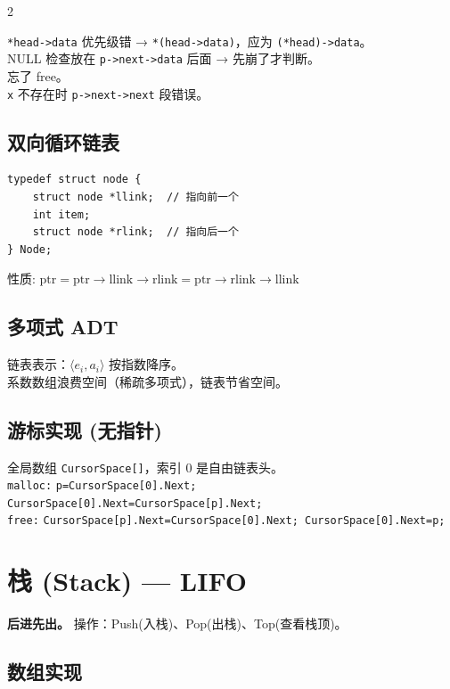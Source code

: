 \documentclass[10pt,a4paper]{article}
\begin{document}
\begin{multicols}{2}
\begin{bugbox}
\texttt{*head->data} 优先级错 → \texttt{*(head->data)}，应为 \texttt{(*head)->data}。\\
NULL 检查放在 \texttt{p->next->data} 后面 → 先崩了才判断。\\
忘了 free。\\
\texttt{x} 不存在时 \texttt{p->next->next} 段错误。
\end{bugbox}

\subsection*{双向循环链表}

\begin{lstlisting}
typedef struct node {
    struct node *llink;  // 指向前一个
    int item;
    struct node *rlink;  // 指向后一个
} Node;
\end{lstlisting}

性质: $\text{ptr} = \text{ptr}\to\text{llink}\to\text{rlink} = \text{ptr}\to\text{rlink}\to\text{llink}$

\subsection*{多项式 ADT}

链表表示：$\langle e_i, a_i \rangle$ 按指数降序。\\
系数数组浪费空间（稀疏多项式），链表节省空间。

\subsection*{游标实现 (无指针)}

全局数组 \texttt{CursorSpace[]}，索引 0 是自由链表头。\\
\texttt{malloc:} \texttt{p=CursorSpace[0].Next; CursorSpace[0].Next=CursorSpace[p].Next;}\\
\texttt{free:} \texttt{CursorSpace[p].Next=CursorSpace[0].Next; CursorSpace[0].Next=p;}

\columnbreak

\section*{栈 (Stack) — LIFO}

\textbf{后进先出。} 操作：Push(入栈)、Pop(出栈)、Top(查看栈顶)。

\subsection*{数组实现}


\end{multicols}
\end{document}
